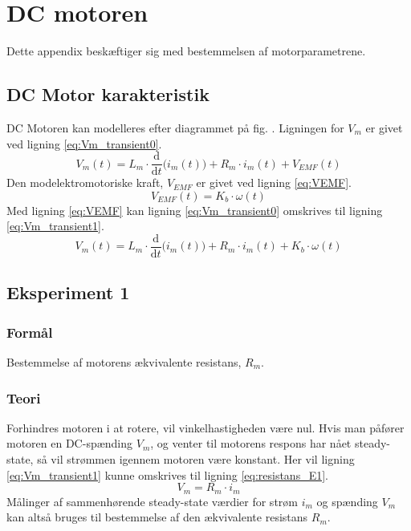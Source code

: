 \section{DC motoren}
Dette appendix beskæftiger sig med bestemmelsen af motorparametrene.
\subsection{DC Motor karakteristik}
DC Motoren kan modelleres efter diagrammet på fig. .
Ligningen for $V_m$ er givet ved ligning \ref{eq:Vm_transient0}.
\begin{equation}
	V_m(t)=L_m \cdot \frac{\mathrm d}{\mathrm d t} \big( i_m(t) \big)+R_m \cdot i_m(t) + V_{EMF}(t)
	\label{eq:Vm_transient0} 
 \end{equation}
Den modelektromotoriske kraft, $V_{EMF}$ er givet ved ligning \ref{eq:VEMF}.
\begin{equation}
	V_{EMF}(t) = K_b \cdot \omega(t)
	\label{eq:VEMF}
\end{equation}
Med ligning \ref{eq:VEMF} kan ligning \ref{eq:Vm_transient0} omskrives til ligning \ref{eq:Vm_transient1}.
\begin{equation}
	V_m(t)=L_m \cdot \frac{\mathrm d}{\mathrm d t} \big( i_m(t) \big)+R_m \cdot i_m(t) +K_b \cdot \omega(t)
	\label{eq:Vm_transient1} 
 \end{equation}

\subsection{Eksperiment 1}
\label{ss:eksperiment1}
\subsubsection{Formål}
Bestemmelse af motorens ækvivalente resistans, $R_m$.
\subsubsection{Teori}
Forhindres motoren i at rotere, vil vinkelhastigheden være nul.
Hvis man påfører motoren en DC-spænding $V_m$,
og venter til motorens respons har nået steady-state,
så vil strømmen igennem motoren være konstant.
Her vil ligning \ref{eq:Vm_transient1} kunne omskrives til ligning \ref{eq:resistans_E1}.
\begin{equation}
	V_m=R_m \cdot i_m
	\label{eq:resistans_E1} 
 \end{equation}
Målinger af sammenhørende steady-state værdier for strøm $i_m$ og spænding $V_m$
kan altså bruges til bestemmelse af den ækvivalente resistans $R_m$.

